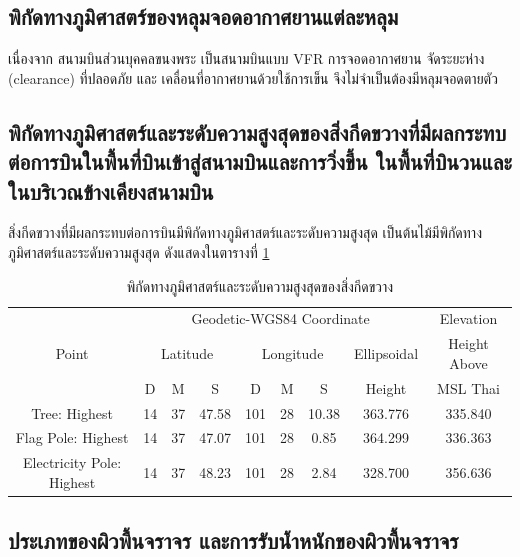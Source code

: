 \subsection{พิกัดทางภูมิศาสตร์ของหลุมจอดอากาศยานแต่ละหลุม}

เนื่องจาก สนามบินส่วนบุคคลขนงพระ เป็นสนามบินแบบ VFR การจอดอากาศยาน จัดระยะห่าง (clearance) ที่ปลอดภัย และ เคลื่อนที่อากาศยานด้วยใช้การเข็น  จึงไม่จำเป็นต้องมีหลุมจอดตายตัว

\subsection{พิกัดทางภูมิศาสตร์และระดับความสูงสุดของสิ่งกีดขวางที่มีผลกระทบต่อการบินในพื้นที่บินเข้าสู่สนามบินและการวิ่งขึ้น ในพื้นที่บินวนและในบริเวณข้างเคียงสนามบิน}

สิ่งกีดขวางที่มีผลกระทบต่อการบินมีพิกัดทางภูมิศาสตร์และระดับความสูงสุด เป็นต้นไม้มีพิกัดทางภูมิศาสตร์และระดับความสูงสุด ดังแสดงในตารางที่ \ref{พิกัดทางภูมิศาสตร์และระดับความสูงสุดของสิ่งกีดขวาง}

\begin{table}[h!]
\caption{พิกัดทางภูมิศาสตร์และระดับความสูงสุดของสิ่งกีดขวาง}
\begin{center}
\begin{tabular}{|c|c|c|c|c|c|c|c|c|}
\hline
\multirow{3}{*}{Point} & \multicolumn{7}{c|}{Geodetic-WGS84 Coordinate} & Elevation \\ \cline{2-9}
 & \multicolumn{3}{c|}{Latitude} & \multicolumn{3}{c|}{Longitude} & Ellipsoidal & Height Above \\ \cline{2-9}
  & D & M & S & D & M & S & Height & MSL Thai \\
\hline
Tree: Highest & 14 & 37 & 47.58 & 101 & 28 & 10.38 & 363.776 & 335.840 \\
Flag Pole: Highest & 14 & 37 & 47.07 & 101 & 28 & 0.85 & 364.299 & 336.363 \\
Electricity Pole: Highest & 14 & 37 & 48.23 & 101 & 28 & 2.84 & 328.700 & 356.636 \\
\hline 
\end{tabular}
\end{center}
\label{พิกัดทางภูมิศาสตร์และระดับความสูงสุดของสิ่งกีดขวาง}
\end{table}%

\newpage

\subsection{ประเภทของผิวพื้นจราจร และการรับน้ำหนักของผิวพื้นจราจร}

